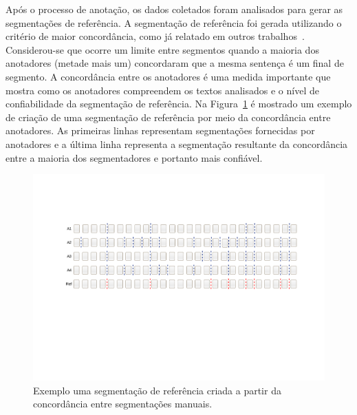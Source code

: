   
  Após o processo de anotação, os dados coletados foram analisados para gerar as segmentações de referência. A segmentação de referência foi gerada utilizando o critério de maior concordância, como já relatado em outros trabalhos~\cite{Hearst1997, Cardoso2017, Kazantseva2012, Passonneau1997, Galley2003}. Considerou-se que ocorre um limite entre segmentos quando a maioria dos anotadores (metade mais um) concordaram que a mesma sentença é um final de segmento. A concordância entre os anotadores é uma medida importante que mostra como os anotadores compreendem os textos analisados e o nível de confiabilidade da segmentação de referência. Na Figura~\ref{fig:concordanciasegref} é mostrado um exemplo de criação de uma segmentação de referência por meio da concordância entre anotadores. As primeiras linhas representam segmentações fornecidas por anotadores e a última linha representa a segmentação resultante da concordância entre a maioria dos segmentadores e portanto mais confiável. 

  \begin{center}
	\begin{figure}[h!]

	\includegraphics[trim={ 95 255 75 140 },clip,page=1,width=\textwidth]{conteudo/capitulos/figs/segmentacao-referencia.pdf}

	\caption{Exemplo uma segmentação de referência criada a partir da concordância entre segmentações manuais.}
	\label{fig:concordanciasegref}
	\end{figure}
\end{center}

